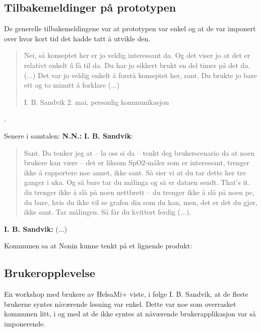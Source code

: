 \subsection{Tilbakemeldinger på prototypen}
De generelle tilbakemeldingene var at prototypen var enkel og at de var imponert over hvor kort tid det hadde tatt å utvikle den.
\blockquote[I. B. Sandvik 2. mai, personlig kommunikasjon]{Nei, så konseptet her er jo veldig interessant da. Og det viser jo at det er relativt enkelt å få til da.
Du har jo sikkert brukt en del timer på det da. (...) Det var jo veldig enkelt å forstå konseptet her, sant. Du brukte jo bare ett og to minutt å forklare (...)}{.}

Senere i samtalen:\newline
\textbf{N.N.:}  \newline
\textbf{I. B. Sandvik}: \blockquote{Sant. Da tenker jeg at -- la oss si da -- tenkt deg brukerscenario da at noen brukere kan være -- det er liksom SpO2-måler som er
    interessant, trenger ikke å rapportere noe annet, ikke sant. Så sier vi at du tar dette her tre ganger i uka. Og så bare tar du målinga og så er dataen sendt. That's
    it. du trenger ikke å slå på noen nettbrett -- du trenger ikke å slå på noen pc, du bare, hvis du ikke vil se grafen din som du kan, men, det er det du gjør, ikke
sant. Tar målingen. Så får du kvittert ferdig (...).}

\textbf{I. B. Sandvik:}
 (...)

Kommunen sa at Nonin kunne tenkt på et lignende produkt: 

\subsection{Brukeropplevelse}
En workshop med brukere av HelsaMi+ viste, i følge I. B. Sandvik, at de fleste brukerne syntes nåværende løsning var enkel. Dette var noe som overrasket
kommunen litt, i og med at de ikke syntes at nåværende brukerapplikasjon var så imponerende.

